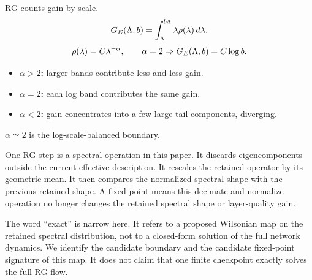 \documentclass[10pt,twocolumn]{article}
\newcommand{\takeaway}[1]{%
  \par\vspace{4pt}\noindent\textcolor{boxblue}{#1}%
}
\newcommand{\eqtight}[1]{\[\vspace{-1pt}#1\vspace{-3pt}\]}
\begin{document}
\begin{tcolorbox}[marginalbox,title=\textbf{12. RG boundary}]
RG counts gain by scale.
\eqtight{G_E(\Lambda,b)=\int_\Lambda^{b\Lambda}\lambda\rho(\lambda)\,d\lambda.}
\eqtight{\rho(\lambda)=C\lambda^{-\alpha},\qquad \alpha=2\Rightarrow G_E(\Lambda,b)=C\log b.}
\begin{itemize}
\item \textbf{$\alpha>2$:} larger bands contribute less and less gain.
\item \textbf{$\alpha=2$:} each log band contributes the same gain.
\item \textbf{$\alpha<2$:} gain concentrates into a few large tail components, diverging.
\end{itemize}
\takeaway{$\alpha\simeq2$ is the log-scale-balanced boundary.}
\end{tcolorbox}

One RG step is a spectral operation in this paper. It discards eigencomponents outside the current effective description. It rescales the retained operator by its geometric mean. It then compares the normalized spectral shape with the previous retained shape. A fixed point means this decimate-and-normalize operation no longer changes the retained spectral shape or layer-quality gain.

The word ``exact'' is narrow here. It refers to a proposed Wilsonian map on the retained spectral distribution, not to a closed-form solution of the full network dynamics. We identify the candidate boundary and the candidate fixed-point signature of this map. It does not claim that one finite checkpoint exactly solves the full RG flow.
\end{document}
